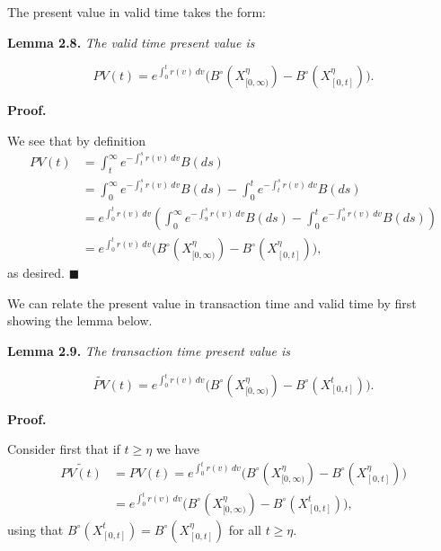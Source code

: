\documentclass[a4paper,10pt,openany]{book}
\begin{document}
The present value in valid time takes the form:

\textbf{Lemma 2.8.} \emph{The valid time present value is}

\[
PV(t)=e^{\int_0^t r(v)\ dv}\Big(B^\circ(X^\eta_{[0,\infty)})-B^\circ(X^\eta_{[0,t]})\Big).
\]

\textbf{Proof.}

We see that by definition
\begin{align*}
PV(t)&=\int_t^\infty e^{-\int_t^s r(v)\ dv}B(ds)\\
&=\int_0^\infty e^{-\int_t^s r(v)\ dv}B(ds)-\int_0^t e^{-\int_t^s r(v)\ dv}B(ds)\\
&=e^{\int_0^t r(v)\ dv}\left(\int_0^\infty e^{-\int_9^s r(v)\ dv}B(ds)-\int_0^t e^{-\int_0^s r(v)\ dv}B(ds)\right)\\
&=e^{\int_0^t r(v)\ dv}\Big(B^\circ(X^\eta_{[0,\infty)})-B^\circ(X^\eta_{[0,t]})\Big),
\end{align*}
as desired. \(\blacksquare\)

We can relate the present value in transaction time and valid time by first showing the lemma below.

\textbf{Lemma 2.9.} \emph{The transaction time present value is}

\[
\tilde{PV}(t)=e^{\int_0^t r(v)\ dv}\Big(B^\circ(X^\eta_{[0,\infty)})-B^\circ(X^t_{[0,t]})\Big).
\]

\textbf{Proof.}

Consider first that if \(t\ge \eta\) we have
\begin{align*}
\tilde{PV(t)}&=PV(t)=e^{\int_0^t r(v)\ dv}\Big(B^\circ(X^\eta_{[0,\infty)})-B^\circ(X^\eta_{[0,t]})\Big)\\
&=e^{\int_0^t r(v)\ dv}\Big(B^\circ(X^\eta_{[0,\infty)})-B^\circ(X^t_{[0,t]})\Big),
\end{align*}
using that \(B^\circ(X^t_{[0,t]})=B^\circ(X^\eta_{[0,t]})\) for all \(t\ge \eta\).
\end{document}
